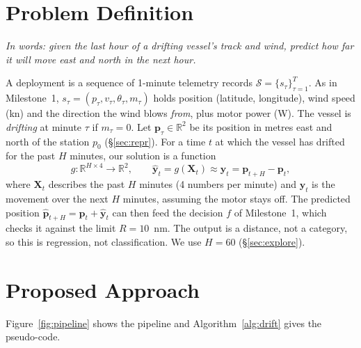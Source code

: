 \documentclass[sigconf]{acmart}
\begin{document}
\section{Problem Definition}\label{sec:problem}
\emph{In words: given the last hour of a drifting vessel's track and wind, predict how far it will move east and north in the next hour.}

A deployment is a sequence of 1-minute telemetry records $\mathcal{S}=\{s_\tau\}_{\tau=1}^{T}$. As in Milestone~1, $s_\tau=(p_\tau,v_\tau,\theta_\tau,m_\tau)$ holds position (latitude, longitude), wind speed (kn) and the direction the wind blows \emph{from}, plus motor power (W). The vessel is \emph{drifting} at minute $\tau$ if $m_\tau=0$. Let $\mathbf{p}_\tau\in\mathbb{R}^2$ be its position in metres east and north of the station $p_0$ (\S\ref{sec:repr}). For a time $t$ at which the vessel has drifted for the past $H$ minutes, our solution is a function
\begin{equation}\label{eq:g}
g:\mathbb{R}^{H\times 4}\rightarrow\mathbb{R}^{2},\qquad \hat{\mathbf{y}}_t=g(\mathbf{X}_t)\approx\mathbf{y}_t=\mathbf{p}_{t+H}-\mathbf{p}_t,
\end{equation}
where $\mathbf{X}_t$ describes the past $H$ minutes (4 numbers per minute) and $\mathbf{y}_t$ is the movement over the next $H$ minutes, assuming the motor stays off. The predicted position $\hat{\mathbf{p}}_{t+H}=\mathbf{p}_t+\hat{\mathbf{y}}_t$ can then feed the decision $f$ of Milestone~1, which checks it against the limit $R=10$~nm. The output is a distance, not a category, so this is regression, not classification. We use $H=60$ (\S\ref{sec:explore}).

\section{Proposed Approach}\label{sec:approach}
Figure~\ref{fig:pipeline} shows the pipeline and Algorithm~\ref{alg:drift} gives the pseudo-code.
\end{document}
